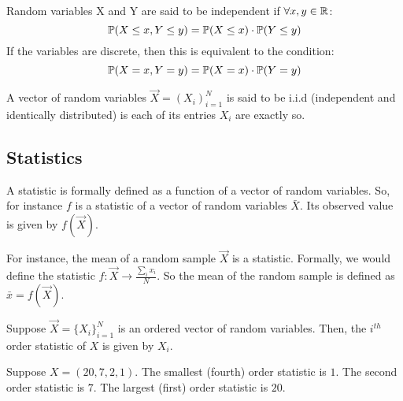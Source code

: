 
\begin{definition}[Independence]
Random variables X and Y are said to be independent if $\forall x,y \in \R$:
$$ \P(X \leq x, Y \leq y) = \P(X \leq x) \cdot \P(Y \leq y)$$
If the variables are discrete, then this is equivalent to the condition:
$$ \P(X = x, Y = y) = \P(X = x) \cdot \P(Y = y) $$
\end{definition}

\begin{definition}[i.i.d]
A vector of random variables $\vec{X} = (X_i)_{i = 1}^N$ is said to be i.i.d (independent and identically distributed) is each of its entries $X_i$ are exactly so.
\end{definition}

\subsection{Statistics}

\begin{definition}[Statistic]
A statistic is formally defined as a function of a vector of random variables. So, for instance $f$ is a statistic of a vector of random variables $\bar{X}$. Its observed value is given by $f(\vec{X})$.
\end{definition}

\begin{example}
For instance, the mean of a random sample $\vec{X}$ is a statistic. Formally, we would define the statistic $f : \vec{X} \to \frac{\sum_i x_i}{N}$. So the mean of the random sample is defined as $\bar{x} = f(\vec{X})$.
\end{example}


\begin{definition}
Suppose $\vec{X} = \{X_i\}_{i = 1}^N$ is an ordered vector of random variables. Then, the $i^{th}$ order statistic of $X$ is given by $X_i$.
\end{definition}

\begin{example}
Suppose $X = (20,7,2,1)$. The smallest (fourth) order statistic is $1$. The second order statistic is $7$. The largest (first) order statistic is $20$.
\end{example}

